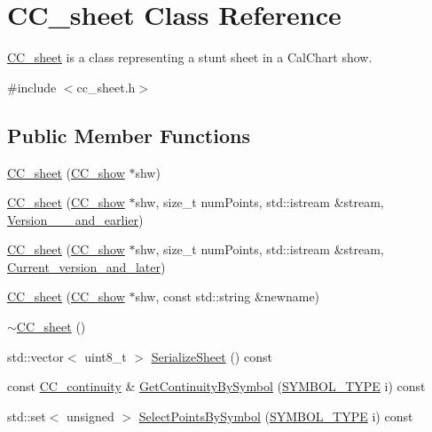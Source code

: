 \hypertarget{a00045}{\section{C\-C\-\_\-sheet Class Reference}
\label{a00045}
}


\hyperlink{a00045}{C\-C\-\_\-sheet} is a class representing a stunt sheet in a Cal\-Chart show.  




{\ttfamily \#include $<$cc\-\_\-sheet.\-h$>$}

\subsection*{Public Member Functions}
\begin{DoxyCompactItemize}
\item 
\hyperlink{a00045_ab0c9904f0e686fbe57c6ca6bdba09bab}{C\-C\-\_\-sheet} (\hyperlink{a00046}{C\-C\-\_\-show} $\ast$shw)
\item 
\hyperlink{a00045_a30372414cfea18692e4dab3953f6a72c}{C\-C\-\_\-sheet} (\hyperlink{a00046}{C\-C\-\_\-show} $\ast$shw, size\-\_\-t num\-Points, std\-::istream \&stream, \hyperlink{a00153}{Version\-\_\-\_\-\_\-and\-\_\-earlier})
\item 
\hyperlink{a00045_acbccbd9050a2b2a1b4a4dc391669647f}{C\-C\-\_\-sheet} (\hyperlink{a00046}{C\-C\-\_\-show} $\ast$shw, size\-\_\-t num\-Points, std\-::istream \&stream, \hyperlink{a00097}{Current\-\_\-version\-\_\-and\-\_\-later})
\item 
\hyperlink{a00045_afa1de8d4ee5bbd666578eaaf6944578f}{C\-C\-\_\-sheet} (\hyperlink{a00046}{C\-C\-\_\-show} $\ast$shw, const std\-::string \&newname)
\item 
\hyperlink{a00045_ac6f9cf59f8311ccac9c2335c16711e2a}{$\sim$\-C\-C\-\_\-sheet} ()
\item 
std\-::vector$<$ uint8\-\_\-t $>$ \hyperlink{a00045_afc1de05de1b53f5f59ad47c310ed334f}{Serialize\-Sheet} () const 
\item 
const \hyperlink{a00027}{C\-C\-\_\-continuity} \& \hyperlink{a00045_a85deb4da787ce4624eae061d227efc50}{Get\-Continuity\-By\-Symbol} (\hyperlink{a00216_a68cd84e0300be6f9ff4474682762c9ee}{S\-Y\-M\-B\-O\-L\-\_\-\-T\-Y\-P\-E} i) const 
\item 
std\-::set$<$ unsigned $>$ \hyperlink{a00045_a35396e54a607e36b4f6a1f48cf34f94a}{Select\-Points\-By\-Symbol} (\hyperlink{a00216_a68cd84e0300be6f9ff4474682762c9ee}{S\-Y\-M\-B\-O\-L\-\_\-\-T\-Y\-P\-E} i) const 
\item 

\end{DoxyCompactItemize}
